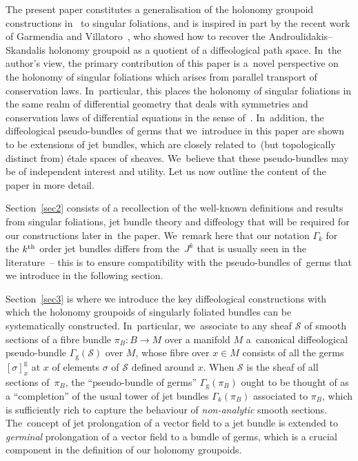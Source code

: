\documentclass[pdftex]{sigma}
\numberwithin{equation}{section}
\def\g{\operatorname{g}}
\def\SS{{\mathscr{S}}}
\begin{document}
The present paper constitutes a generalisation of the holonomy groupoid constructions in~\cite{mac3} to singular foliations, and is inspired in part by the recent work of Garmendia and Villatoro~\cite{VilGar1}, who showed how to recover the Androulidakis--Skandalis holonomy groupoid as a quotient of a diffeological path space. In~the author's view, the primary contribution of this paper is a~novel perspective on the holonomy of singular foliations which arises from parallel transport of conservation laws. In~particular, this places the holonomy of singular foliations in the same realm of differential geometry that deals with symmetries and conservation laws of differential equations in the sense of~\cite{varbi,olver}. In~addition, the diffeological pseudo-bundles of germs that we~introduce in this paper are shown to be extensions of jet bundles, which are closely related to~(but topologically distinct from) \'{e}tale spaces of sheaves. We~believe that these pseudo-bundles may be of independent interest and utility. Let us now outline the content of the paper in more detail.

Section~\ref{sec2} consists of a recollection of the well-known definitions and results from singular foliations, jet bundle theory and diffeology that will be required for our constructions later in~the paper. We~remark here that our notation $\Gamma_{k}$ for the $k^{\rm th}$ order jet bundles differs from the~$J^{k}$ that is usually seen in the literature~-- this is to ensure compatibility with the pseudo-bundles of~germs that we introduce in the following section.

Section~\ref{sec3} is where we introduce the key diffeological constructions with which the holonomy groupoids of singularly foliated bundles can be systematically constructed. In~particular, we~asso\-ciate to any sheaf $\SS$ of smooth sections of a fibre bundle $\pi_{B}\colon B\rightarrow M$ over a manifold $M$ a~cano\-nical diffeological pseudo-bundle $\Gamma_{\g}(\SS)$ over $M$, whose fibre over $x\in M$ consists of all the germs $[\sigma]^{\g}_{x}$ at $x$ of elements $\sigma$ of $\SS$ defined around $x$. When $\SS$ is the sheaf of all sections of~$\pi_{B}$, the ``pseudo-bundle of germs'' $\Gamma_{\g}(\pi_{B})$ ought to be thought of as a ``completion'' of the usual tower of jet bundles $\Gamma_{k}(\pi_{B})$ associated to $\pi_{B}$, which is sufficiently rich to capture the behaviour of \textit{non-analytic} smooth sections. The~concept of jet prolongation of a vector field to a jet bundle is extended to \textit{germinal} prolongation of a vector field to a bundle of germs, which is a crucial component in the definition of our holonomy groupoids.
\end{document}
